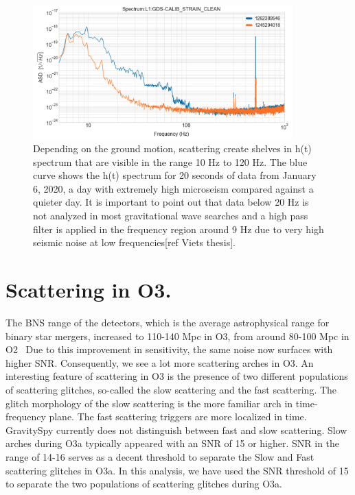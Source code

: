 \documentclass[12pt]{iopart}
\begin{document}
\begin{figure}[h]
    \centering
    \includegraphics[width=10cm]{scatshelf4.png}
    \caption{ Depending on the ground motion, scattering create shelves in h(t) spectrum that are visible in the range 10 Hz to 120 Hz. The blue curve shows the h(t) spectrum for 20 seconds of data from January 6, 2020, a day with extremely high microseism compared against a quieter day. It is important to point out that data below 20 Hz is not analyzed in most gravitational wave searches and a high pass filter is applied in the frequency region around 9 Hz due to very high seismic noise at low frequencies[ref Viets thesis].}
    \label{fig:scatshelf1}
\end{figure}
\section{Scattering in O3.}\label{scatino3}
The BNS range of the detectors, which is the average astrophysical range for binary star mergers, increased to 110-140 Mpc in O3, from around 80-100 Mpc in O2~\cite{prospect} Due to this improvement in sensitivity, the same noise now surfaces with higher SNR.
Consequently, we see a lot more scattering arches in O3. An interesting feature of scattering in O3 is the presence of two different populations of scattering glitches, so-called the slow scattering and the fast scattering. The glitch morphology of the slow scattering is the more familiar arch in time-frequency plane. The fast scattering triggers are more localized in time. GravitySpy currently does not distinguish between fast and slow scattering. Slow arches during O3a  typically appeared with an SNR of 15 or higher. SNR in the range of 14-16 serves as a decent threshold to separate the Slow and Fast scattering glitches in O3a. In this analysis, we have used the SNR threshold of 15 to separate the two populations of scattering glitches during O3a.
\end{document}

